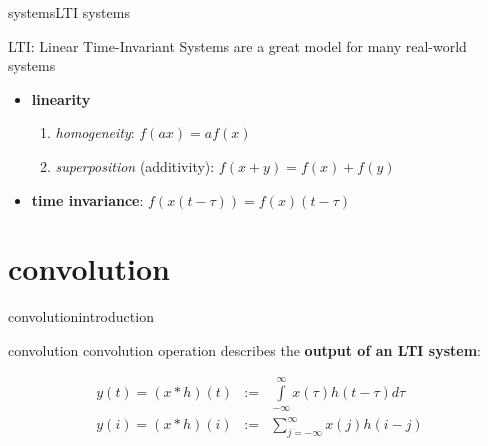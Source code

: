         \begin{frame}{systems}{LTI systems}
            \begin{block}{LTI: Linear Time-Invariant Systems}
                are a great model for many real-world systems
            \end{block}
            
            \bigskip
            \begin{itemize}
                \item   \textbf{linearity}
                   \begin{enumerate}
                        \item   \textit{homogeneity}:
                            $f(ax) = a f(x)$
                        \smallskip
                        \item   \textit{superposition} (additivity):
                        $f(x+y) = f(x) + f(y)$
                    \end{enumerate}
                 \bigskip
                \item   \textbf{time invariance}:
                    $f\left(x(t-\tau)\right) = f(x)(t-\tau)$
             \end{itemize}
        \end{frame}
     
    \section[convolution]{convolution}
        \begin{frame}{convolution}{introduction}
                \begin{block}{convolution}
                    convolution operation describes the \textbf{output of an LTI system}:
                \end{block}
                
            \bigskip
            \begin{eqnarray*}
                y(t) = (x \ast h)(t) &:=& \int\limits_{-\infty}^{\infty}x(\tau)h(t-\tau)d\tau\\
                y(i) = (x \ast h)(i) &:=& \sum\limits_{j=-\infty}^{\infty}x(j)h(i-j)
            \end{eqnarray*}
        \end{frame}
            
